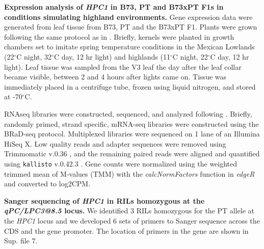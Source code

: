 \documentclass[9pt,twocolumn,twoside,lineno]{BioRxiv}
\begin{document}
\textbf{Expression analysis of \textit{HPC1} in B73, PT and B73xPT F1s in conditions simulating highland environments.}
Gene expression data were generated from leaf tissue from B73, PT and the B73xPT F1. 
Plants were grown following the same protocol as in \cite{Crow2020-gene}.
Briefly, kernels were planted in growth chambers set to imitate spring temperature conditions in the Mexican Lowlands (22$^{\circ}$C night, 32$^{\circ}$C day, 12 hr light) and highlands (11$^{\circ}$C night, 22$^{\circ}$C day, 12 hr light). 
Leaf tissue was sampled from the V3 leaf the day after the leaf collar became visible, between 2 and 4 hours after lights came on. Tissue was immediately placed in a centrifuge tube, frozen using liquid nitrogen, and stored at -70$^{\circ}$C.

RNAseq libraries were constructed, sequenced, and analyzed following \cite{Crow2020-gene}. 
Briefly, randomly primed, strand specific, mRNA-seq libraries were constructed using the BRaD-seq \cite{townsley2015brad} protocol.
Multiplexed libraries were sequenced on 1 lane of an Illumina HiSeq X. 
Low quality reads and adapter sequences were removed using Trimmomatic v.0.36 \cite{bolger2014trimmomatic}, and the remaining paired reads were aligned and quantified using \texttt{kallisto} v.0.42.3 \cite{bray2016near}. 
Gene counts were normalized using the weighted trimmed mean of M-values (TMM) with the \textit{calcNormFactors} function in \textit{edgeR} \cite{robinson2010edger} and converted to log2CPM.

\textbf{Sanger sequencing of \textit{HPC1} in RILs homozygous at the \textit{qPC/LPC3@8.5} locus.}
We identified 3 RILs homozygous for the PT allele at the \textit{HPC1} locus and we developed 6 sets of primers to Sanger sequence across the CDS and the gene promoter. 
The location of primers in the gene are shown in Sup. file 7. 
\end{document}
